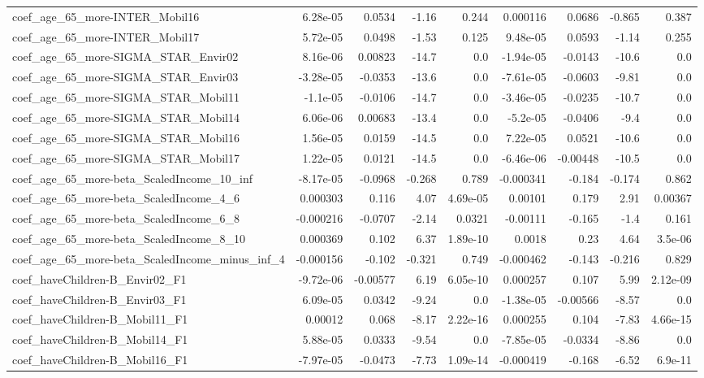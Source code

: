 \begin{tabular}{lrrrrrrrr}
coef_age_65_more-INTER_Mobil16 & 6.28e-05 & 0.0534 & -1.16 & 0.244 & 0.000116 & 0.0686 & -0.865 & 0.387 \\
coef_age_65_more-INTER_Mobil17 & 5.72e-05 & 0.0498 & -1.53 & 0.125 & 9.48e-05 & 0.0593 & -1.14 & 0.255 \\
coef_age_65_more-SIGMA_STAR_Envir02 & 8.16e-06 & 0.00823 & -14.7 & 0.0 & -1.94e-05 & -0.0143 & -10.6 & 0.0 \\
coef_age_65_more-SIGMA_STAR_Envir03 & -3.28e-05 & -0.0353 & -13.6 & 0.0 & -7.61e-05 & -0.0603 & -9.81 & 0.0 \\
coef_age_65_more-SIGMA_STAR_Mobil11 & -1.1e-05 & -0.0106 & -14.7 & 0.0 & -3.46e-05 & -0.0235 & -10.7 & 0.0 \\
coef_age_65_more-SIGMA_STAR_Mobil14 & 6.06e-06 & 0.00683 & -13.4 & 0.0 & -5.2e-05 & -0.0406 & -9.4 & 0.0 \\
coef_age_65_more-SIGMA_STAR_Mobil16 & 1.56e-05 & 0.0159 & -14.5 & 0.0 & 7.22e-05 & 0.0521 & -10.6 & 0.0 \\
coef_age_65_more-SIGMA_STAR_Mobil17 & 1.22e-05 & 0.0121 & -14.5 & 0.0 & -6.46e-06 & -0.00448 & -10.5 & 0.0 \\
coef_age_65_more-beta_ScaledIncome_10_inf & -8.17e-05 & -0.0968 & -0.268 & 0.789 & -0.000341 & -0.184 & -0.174 & 0.862 \\
coef_age_65_more-beta_ScaledIncome_4_6 & 0.000303 & 0.116 & 4.07 & 4.69e-05 & 0.00101 & 0.179 & 2.91 & 0.00367 \\
coef_age_65_more-beta_ScaledIncome_6_8 & -0.000216 & -0.0707 & -2.14 & 0.0321 & -0.00111 & -0.165 & -1.4 & 0.161 \\
coef_age_65_more-beta_ScaledIncome_8_10 & 0.000369 & 0.102 & 6.37 & 1.89e-10 & 0.0018 & 0.23 & 4.64 & 3.5e-06 \\
coef_age_65_more-beta_ScaledIncome_minus_inf_4 & -0.000156 & -0.102 & -0.321 & 0.749 & -0.000462 & -0.143 & -0.216 & 0.829 \\
coef_haveChildren-B_Envir02_F1 & -9.72e-06 & -0.00577 & 6.19 & 6.05e-10 & 0.000257 & 0.107 & 5.99 & 2.12e-09 \\
coef_haveChildren-B_Envir03_F1 & 6.09e-05 & 0.0342 & -9.24 & 0.0 & -1.38e-05 & -0.00566 & -8.57 & 0.0 \\
coef_haveChildren-B_Mobil11_F1 & 0.00012 & 0.068 & -8.17 & 2.22e-16 & 0.000255 & 0.104 & -7.83 & 4.66e-15 \\
coef_haveChildren-B_Mobil14_F1 & 5.88e-05 & 0.0333 & -9.54 & 0.0 & -7.85e-05 & -0.0334 & -8.86 & 0.0 \\
coef_haveChildren-B_Mobil16_F1 & -7.97e-05 & -0.0473 & -7.73 & 1.09e-14 & -0.000419 & -0.168 & -6.52 & 6.9e-11 \\

\end{tabular}
